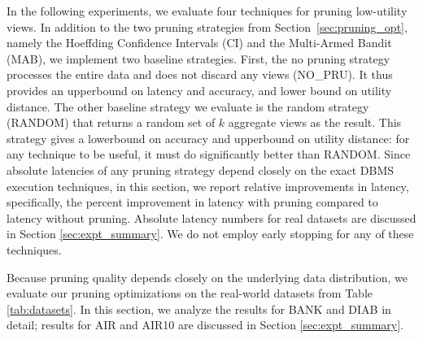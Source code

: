 In the following experiments, we evaluate four techniques for pruning low-utility views.
In addition to the two pruning strategies from Section~\ref{sec:pruning_opt}, 
namely the Hoeffding Confidence Intervals (CI) and the Multi-Armed Bandit (MAB),
we implement two baseline strategies.
First, the no pruning strategy processes the entire data and does not discard any views (NO\_PRU). 
It thus provides an upperbound on latency and accuracy, and lower bound on utility distance.
The other baseline strategy we evaluate is the random strategy (RANDOM) that returns a random 
set of $k$ aggregate views as the result.
This strategy gives a lowerbound on accuracy and upperbound on utility distance: for any 
technique to be useful, it must do significantly better than RANDOM.
Since absolute latencies of any pruning strategy depend closely on the exact DBMS execution techniques, 
in this section, we report relative improvements in latency, specifically, the percent improvement 
in latency with pruning compared to latency without pruning.
Absolute latency numbers for real datasets are discussed in Section \ref{sec:expt_summary}.
We do not employ early stopping for any of these techniques.


Because pruning quality depends closely on the underlying data distribution, we evaluate
our pruning optimizations on the real-world datasets from Table \ref{tab:datasets}. 
In this section, we analyze the results for BANK and DIAB in detail; results for AIR and AIR10 are 
discussed in Section \ref{sec:expt_summary}. 






